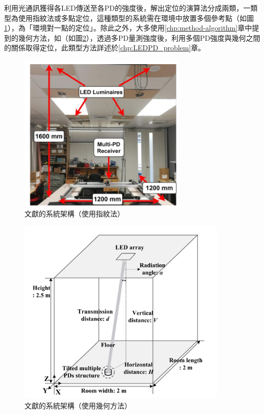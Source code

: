 \begin{description}
                    \qquad
                    利用光通訊獲得各LED傳送至各PD的強度後，解出定位的演算法分成兩類，一類型為使用指紋法或多點定位，這種類型的系統需在環境中放置多個參考點（如圖\ref{pic:env_finger}），為「環境對一點的定位」。除此之外，大多使用\ref{chp:method-algorithm}章中提到的幾何方法，如\cite{case:3d_layers}（如圖\ref{pic:env_1to1}），透過多PD量測強度後，利用多個PD強度與幾何之間的關係取得定位，此類型方法詳述於\ref{chp:LEDPD_problem}章。

                    \begin{figure}[htpb]
                        \centering
                        \includegraphics[width=8cm]{ch2pic/env_finger.png}
                        \caption{文獻\cite{case:ml}的系統架構（使用指紋法）}
                        \label{pic:env_finger}
                    \end{figure}

                    \begin{figure}[htpb]
                        \centering
                        \includegraphics[width=10cm]{ch2pic/env_1to1.png}
                        \caption{文獻\cite{case:3d_layers}的系統架構（使用幾何方法）}
                        \label{pic:env_1to1}
                    \end{figure}

                \end{description}

